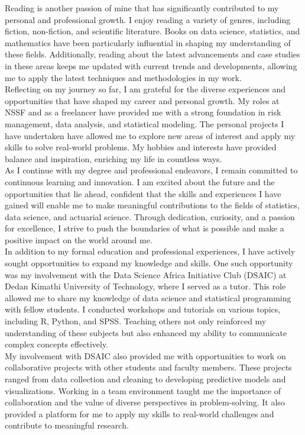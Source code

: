 \documentclass[12pt,a4paper,sans,english]{report}
\begin{document}
\noindent Reading is another passion of mine that has significantly contributed to my personal and professional growth. I enjoy reading a variety of genres, including fiction, non-fiction, and scientific literature. Books on data science, statistics, and mathematics have been particularly influential in shaping my understanding of these fields. Additionally, reading about the latest advancements and case studies in these areas keeps me updated with current trends and developments, allowing me to apply the latest techniques and methodologies in my work.\\

\noindent Reflecting on my journey so far, I am grateful for the diverse experiences and opportunities that have shaped my career and personal growth. My roles at NSSF and as a freelancer have provided me with a strong foundation in risk management, data analysis, and statistical modeling. The personal projects I have undertaken have allowed me to explore new areas of interest and apply my skills to solve real-world problems. My hobbies and interests have provided balance and inspiration, enriching my life in countless ways.\\

\noindent As I continue with my degree and professional endeavors, I remain committed to continuous learning and innovation. I am excited about the future and the opportunities that lie ahead, confident that the skills and experiences I have gained will enable me to make meaningful contributions to the fields of statistics, data science, and actuarial science. Through dedication, curiosity, and a passion for excellence, I strive to push the boundaries of what is possible and make a positive impact on the world around me.\\

\noindent In addition to my formal education and professional experiences, I have actively sought opportunities to expand my knowledge and skills. One such opportunity was my involvement with the Data Science Africa Initiative Club (DSAIC) at Dedan Kimathi University of Technology, where I served as a tutor. This role allowed me to share my knowledge of data science and statistical programming with fellow students. I conducted workshops and tutorials on various topics, including R, Python, and SPSS. Teaching others not only reinforced my understanding of these subjects but also enhanced my ability to communicate complex concepts effectively.\\

\noindent My involvement with DSAIC also provided me with opportunities to work on collaborative projects with other students and faculty members. These projects ranged from data collection and cleaning to developing predictive models and visualizations. Working in a team environment taught me the importance of collaboration and the value of diverse perspectives in problem-solving. It also provided a platform for me to apply my skills to real-world challenges and contribute to meaningful research.\\
\end{document}
